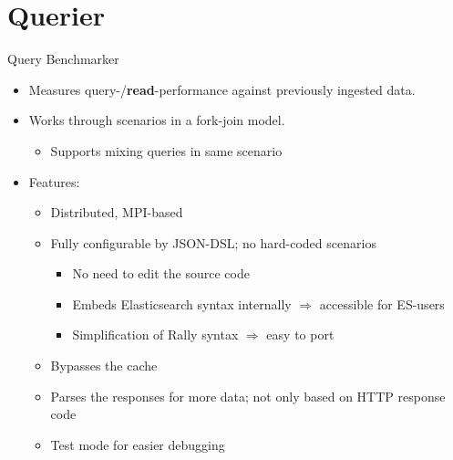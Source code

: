 \documentclass[compress,aspectratio=169]{beamer}
\begin{document}
	\section{Querier}
	\begin{frame}{Query Benchmarker}
		\begin{itemize}
      \item Measures query-/\textbf{read}-performance against previously ingested data.
        \pause
      \item Works through scenarios in a fork-join model.
        \begin{itemize}
          \item Supports mixing queries in same scenario
        \end{itemize}
        \pause
      \item Features:
        \begin{itemize}
          \item Distributed, MPI-based
            \pause
          \item Fully configurable by JSON-DSL; no hard-coded scenarios
            \begin{itemize}
              \item No need to edit the source code
              \item Embeds Elasticsearch syntax internally $\Rightarrow$ accessible for ES-users
              \item Simplification of Rally syntax $\Rightarrow$ easy to port
            \end{itemize}
            \pause
          \item Bypasses the cache
            \pause
          \item Parses the responses for more data; not only based on HTTP response code
            \pause
          \item Test mode for easier debugging
        \end{itemize}
		\end{itemize}
	\end{frame}

  \begin{frame}[fragile]{}
    \begin{tcolorbox}[title=Input Format for Query Benchmarker (part 1)]
    \footnotesize\inputminted[xleftmargin=1em,linenos]{json}{./assets/queryinput.json}
    \end{tcolorbox}
  \end{frame}
  \begin{frame}[fragile]{}
    \begin{tcolorbox}[title=Input Format for Query Benchmarker (part 2)]
    \footnotesize\inputminted[xleftmargin=1em,linenos]{json}{./assets/queryinput2.json}
    \end{tcolorbox}
  \end{frame}
\end{document}
